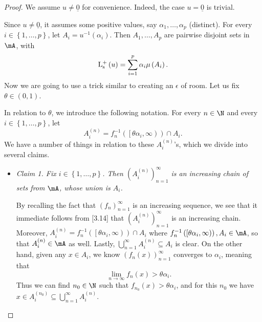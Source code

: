 \documentclass[pmath450]{subfiles}
\begin{document}
    \begin{proof}
        We assume $u\neq\underline{0}$ for convenience. Indeed, the case $u=\underline{0}$ is trivial.

        Since $u\neq\underline{0}$, it assumes some positive values, say $\alpha_1,\ldots,\alpha_p$ (distinct). For every $i\in\left\lbrace 1,\ldots,p \right\rbrace$, let $A_i = u^{-1}\left( \alpha_i \right)$. Then $A_1,\ldots,A_p$ are pairwise disjoint sets in $\mA$, with
        \begin{equation}
            \operatorname{L^+_s}\left( u \right) = \sum^{p}_{i=1}\alpha_i\mu\left( A_i \right).
        \end{equation}
        Now we are going to use a trick similar to creating an $\epsilon$ of room. Let us fix $\theta\in\left( 0,1 \right)$.

        In relation to $\theta$, we introduce the following notation. For every $n\in\N$ and every $i\in\left\lbrace 1,\ldots,p \right\rbrace$, let
        \begin{equation}
            A_i^{\left( n \right)} = f_n^{-1}\left( \left[ \theta\alpha_i,\infty \right) \right)\cap A_i.
        \end{equation}
        We have a number of things in relation to these $A_i^{\left( n \right)}$'s, which we divide into several claims.
        \begin{itemize}
            \item \textit{Claim 1. Fix $i\in\left\lbrace 1,\ldots,p \right\rbrace$. Then $\left( A_{i}^{\left( n \right)} \right)^{\infty}_{n=1}$ is an increasing chain of sets from $\mA$, whose union is $A_i$.}

                \begin{subproof}
                    By recalling the fact that $\left( f_{n} \right)^{\infty}_{n=1}$ is an increasing sequence, we see that it immediate follows from [3.14] that $\left( A_{i}^{\left( n \right)} \right)^{\infty}_{n=1}$ is an increasing chain. Moreover, $A_i^{\left( n \right)} = f_n^{-1}\left( \left[ \theta\alpha_i,\infty \right) \right)\cap A_i$ where $f_n^{-1}\left( \left[ \theta\alpha_i,\infty \right) \right),A_i\in\mA$, so that $A_i^{\left( n \right)}\in\mA$ as well. Lastly, $\bigcup^{\infty}_{n=1}A_i^{\left( n \right)}\subseteq A_i$ is clear. On the other hand, given any $x\in A_i$, we know $\left( f_{n}\left( x \right) \right)^{\infty}_{n=1}$ converges to $\alpha_i$, meaning that
                    \begin{equation*}
                        \lim_{n\to\infty}f_n\left( x \right)>\theta\alpha_i.
                    \end{equation*}
                    Thus we can find $n_0\in\N$ such that $f_{n_0}\left( x \right)>\theta\alpha_i$, and for this $n_0$ we have $x\in A_i^{\left( n_0 \right)}\subseteq\bigcup^{\infty}_{n=1}A_i^{\left( n \right)}$.
                \end{subproof}


\end{itemize}
\end{proof}
\end{document}
